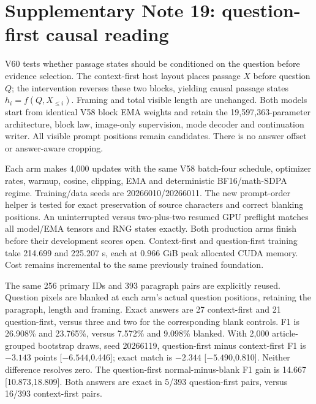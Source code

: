 \documentclass[10pt,a4paper]{article}
\begin{document}

\section*{Supplementary Note 19: question-first causal reading}
V60 tests whether passage states should be conditioned on the question before
evidence selection. The context-first host layout places passage $X$ before
question $Q$; the intervention reverses these two blocks, yielding causal
passage states $h_i=f(Q,X_{\leq i})$. Framing and total visible length are
unchanged. Both models start from identical V58 block EMA weights and retain
the 19,597,363-parameter architecture, block law, image-only supervision,
mode decoder and continuation writer. All visible prompt positions remain
candidates. There is no answer offset or answer-aware cropping.

Each arm makes 4,000 updates with the same V58 batch-four schedule, optimizer
rates, warmup, cosine, clipping, EMA and deterministic BF16/math-SDPA regime.
Training/data seeds are 20266010/20266011. The new prompt-order helper is
tested for exact preservation of source characters and correct blanking
positions. An uninterrupted versus two-plus-two resumed GPU preflight
matches all model/EMA tensors and RNG states exactly. Both production arms
finish before their development scores open. Context-first and question-first
training take 214.699 and 225.207 s, each at 0.966 GiB peak allocated CUDA
memory. Cost remains incremental to the same previously trained foundation.

The same 256 primary IDs and 393 paragraph pairs are explicitly reused.
Question pixels are blanked at each arm's actual question positions, retaining
the paragraph, length and framing. Exact answers are 27 context-first and
21 question-first, versus three and two for the corresponding blank controls.
F1 is 26.908\% and 23.765\%, versus 7.572\% and 9.098\% blanked. With 2,000
article-grouped bootstrap draws, seed 20266119, question-first minus
context-first F1 is $-3.143$ points [$-6.544$,0.446]; exact match is
$-2.344$ [$-5.490$,0.810]. Neither difference resolves zero. The question-first
normal-minus-blank F1 gain is 14.667 [10.873,18.809]. Both answers are exact in
5/393 question-first pairs, versus 16/393 context-first pairs.
\end{document}

